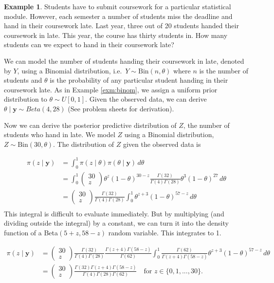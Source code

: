 \documentclass[
]{book}
\theoremstyle{definition}
\theoremstyle{definition}
\newtheorem{example}{Example}[chapter]
\theoremstyle{definition}
\theoremstyle{definition}
\theoremstyle{remark}
\begin{document}
\begin{example}

Students have to submit coursework for a particular statistical module. However, each semester a number of students miss the deadline and hand in their coursework late. Last year, three out of 20 students handed their coursework in late. This year, the course has thirty students in. How many students can we expect to hand in their coursework late?

We can model the number of students handing their coursework in late, denoted by \(Y\), using a Binomial distribution, i.e.~\(Y \sim \textrm{Bin}(n, \theta)\) where \(n\) is the number of students and \(\theta\) is the probability of any particular student handing in their coursework late. As in Example \ref{exm:binom}, we assign a uniform prior distribution to \(\theta \sim U[0, 1]\). Given the observed data, we can derive \(\theta \mid \boldsymbol{y} \sim Beta(4, 28)\) (See problem sheets for derivation).

Now we can derive the posterior predictive distribution of \(Z\), the number of students who hand in late. We model \(Z\) using a Binomial distribution, \(Z \sim \textrm{Bin}(30, \theta)\). The distribution of \(Z\) given the observed data is

\begin{align*}
\pi(z \mid \boldsymbol{y}) &= \int_0^1 \pi(z \mid \theta) \pi(\theta \mid \boldsymbol{y})\, d\theta \\
& = \int_0^1 \begin{pmatrix} 30 \\ z \end{pmatrix} \theta^z (1-\theta)^{30 - z} \frac{\Gamma(32)}{\Gamma(4)\Gamma(28)}\theta^{3}(1-\theta)^{27}\, d\theta \\
 & = \begin{pmatrix} 30 \\ z \end{pmatrix}\frac{\Gamma(32)}{\Gamma(4)\Gamma(28)}\int_0^1 \theta^{z + 3}(1-\theta)^{57 - z}\, d\theta \\
\end{align*}
This integral is difficult to evaluate immediately. But by multiplying (and dividing outside the integral) by a constant, we can turn it into the density function of a Beta\((5 + z, 58 - z)\) random variable. This integrates to 1.

\begin{align*}
\pi(z \mid \boldsymbol{y})  & = \begin{pmatrix} 30 \\ z \end{pmatrix}\frac{\Gamma(32)}{\Gamma(4)\Gamma(28)}\frac{\Gamma(z+4)\Gamma(58-z)}{\Gamma(62)}\int_0^1 \frac{\Gamma(62)}{\Gamma(z+4)\Gamma(58-z)}\theta^{z + 3}(1-\theta)^{57 - z}\, d\theta \\ 
& = \begin{pmatrix} 30 \\ z \end{pmatrix}\frac{\Gamma(32)\Gamma(z+4)\Gamma(58-z)}{\Gamma(4)\Gamma(28)\Gamma(62)} \quad \textrm{for }  z \in \{0,1,...,30 \}.
\end{align*}


\end{example}
\end{document}
